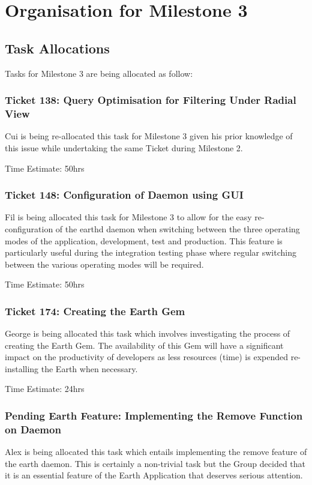 \documentclass[10pt,a4,oneside]{article}
\begin{document}
\section{Organisation for Milestone 3}
 
\label{sec:g1org}

\subsection{Task Allocations}

Tasks for Milestone 3 are being allocated as follow:
 
\subsubsection*{Ticket 138: Query Optimisation for Filtering Under Radial View}
Cui is being re-allocated this task for Milestone 3 given his prior knowledge of this issue while undertaking the same Ticket during Milestone 2.

\noindent Time Estimate: 50hrs
 
\subsubsection*{Ticket 148: Configuration of Daemon using GUI}
Fil is being allocated this task for Milestone 3 to allow for the easy re-configuration of the earthd daemon when switching between the three operating modes of the application, development, test and production. This feature is particularly useful during the integration testing phase where regular switching between the various operating modes will be required.
 
\noindent Time Estimate: 50hrs

\subsubsection*{Ticket 174: Creating the Earth Gem}
George is being allocated this task which involves investigating the process of creating the Earth Gem. The availability of this Gem will have a significant impact on the productivity of developers as less resources (time) is expended re-installing the Earth when necessary.

\noindent Time Estimate: 24hrs
 
\subsubsection*{Pending Earth Feature: Implementing the Remove Function on Daemon}
Alex is being allocated this task which entails implementing the remove feature of the earth daemon. This is certainly a non-trivial task but the Group decided that it is an essential feature of the Earth Application that deserves serious attention.
 
\end{document}
